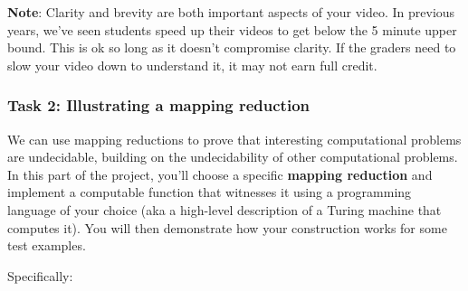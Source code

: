 {\bf Note}: Clarity and brevity are both important aspects of your video.  In previous years, we've seen 
students speed up their videos to get below the 5 minute upper bound. This is ok so long as it doesn't 
compromise clarity. If the graders need to slow your video down to understand
it, it may not earn full credit.


\newpage
\subsubsection*{Task 2: Illustrating a mapping reduction}

We can use mapping reductions to prove that interesting computational 
problems are undecidable, building on 
the undecidability of other computational problems.
In this part of the project, you'll choose a specific {\bf mapping reduction}
and implement a computable function that witnesses it
using a  programming language of your choice (aka a high-level description of a Turing machine that computes it).
You will then demonstrate  how your construction works for some test examples.

Specifically:

\vspace{-10pt}

